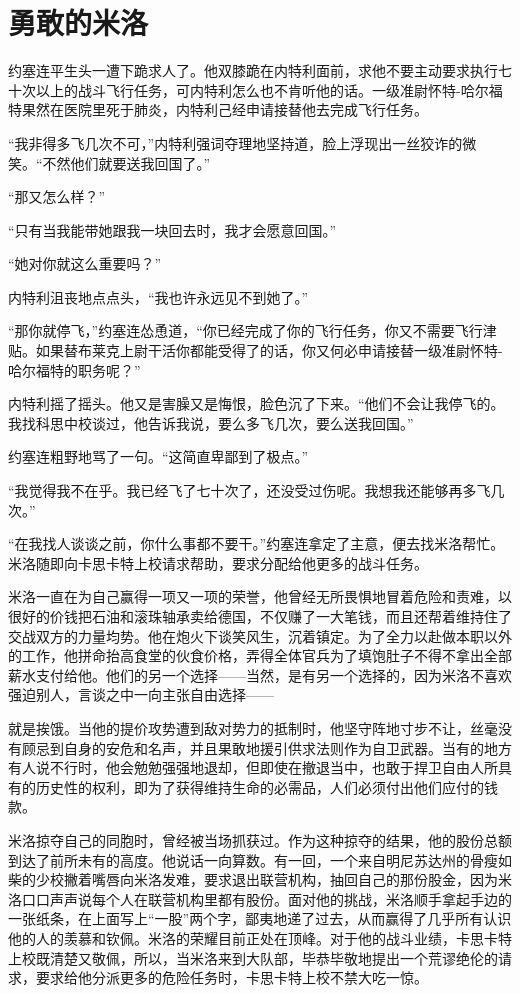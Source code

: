 \chapter{勇敢的米洛}
 
    约塞连平生头一遭下跪求人了。他双膝跪在内特利面前，求他不要主动要求执行七十次以上的战斗飞行任务，可内特利怎么也不肯听他的话。一级准尉怀特-哈尔福特果然在医院里死于肺炎，内特利己经申请接替他去完成飞行任务。

    “我非得多飞几次不可，”内特利强词夺理地坚持道，脸上浮现出一丝狡诈的微笑。“不然他们就要送我回国了。”

    “那又怎么样？”

    “只有当我能带她跟我一块回去时，我才会愿意回国。”

    “她对你就这么重要吗？”

    内特利沮丧地点点头，“我也许永远见不到她了。”

    “那你就停飞，”约塞连怂恿道，“你已经完成了你的飞行任务，你又不需要飞行津贴。如果替布莱克上尉干活你都能受得了的话，你又何必申请接替一级准尉怀特-哈尔福特的职务呢？”

    内特利摇了摇头。他又是害臊又是悔恨，脸色沉了下来。“他们不会让我停飞的。我找科思中校谈过，他告诉我说，要么多飞几次，要么送我回国。”

    约塞连粗野地骂了一句。“这简直卑鄙到了极点。”

    “我觉得我不在乎。我已经飞了七十次了，还没受过伤呢。我想我还能够再多飞几次。”

    “在我找人谈谈之前，你什么事都不要干。”约塞连拿定了主意，便去找米洛帮忙。米洛随即向卡思卡特上校请求帮助，要求分配给他更多的战斗任务。

    米洛一直在为自己赢得一项又一项的荣誉，他曾经无所畏惧地冒着危险和责难，以很好的价钱把石油和滚珠轴承卖给德国，不仅赚了一大笔钱，而且还帮着维持住了交战双方的力量均势。他在炮火下谈笑风生，沉着镇定。为了全力以赴做本职以外的工作，他拼命抬高食堂的伙食价格，弄得全体官兵为了填饱肚子不得不拿出全部薪水支付给他。他们的另一个选择——当然，是有另一个选择的，因为米洛不喜欢强迫别人，言谈之中一向主张自由选择——

 


    就是挨饿。当他的提价攻势遭到敌对势力的抵制时，他坚守阵地寸步不让，丝毫没有顾忌到自身的安危和名声，并且果敢地援引供求法则作为自卫武器。当有的地方有人说不行时，他会勉勉强强地退却，但即使在撤退当中，也敢于捍卫自由人所具有的历史性的权利，即为了获得维持生命的必需品，人们必须付出他们应付的钱款。

    米洛掠夺自己的同胞时，曾经被当场抓获过。作为这种掠夺的结果，他的股份总额到达了前所未有的高度。他说话一向算数。有一回，一个来自明尼苏达州的骨瘦如柴的少校撇着嘴唇向米洛发难，要求退出联营机构，抽回自己的那份股金，因为米洛口口声声说每个人在联营机构里都有股份。面对他的挑战，米洛顺手拿起手边的一张纸条，在上面写上“一股”两个字，鄙夷地递了过去，从而赢得了几乎所有认识他的人的羡慕和钦佩。米洛的荣耀目前正处在顶峰。对于他的战斗业绩，卡思卡特上校既清楚又敬佩，所以，当米洛来到大队部，毕恭毕敬地提出一个荒谬绝伦的请求，要求给他分派更多的危险任务时，卡思卡特上校不禁大吃一惊。

